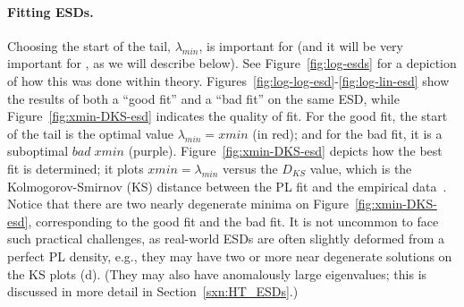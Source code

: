 
\paragraph{Fitting ESDs.}
Choosing the start of the tail, $\lambda_{min}$, is important for \HTSR (and it will be very important for \SETOL, as we will describe below).
See Figure~\ref{fig:log-esds} for a depiction of how this was done within \HTSR theory.
Figures~\ref{fig:log-log-esd}-\ref{fig:log-lin-esd} show the results of both a ``good fit'' and a ``bad fit'' on the same ESD,
while Figure~\ref{fig:xmin-DKS-esd} indicates the quality of fit.
For the good fit, the start of the tail is the optimal value $\lambda_{min}=xmin$ (in red); and for the bad fit, it is a suboptimal $bad\;xmin$ (purple).
Figure~\ref{fig:xmin-DKS-esd} depicts how the best fit is determined; it plots $xmin=\lambda_{min}$ versus the $D_{KS}$ 
value, which is the Kolmogorov-Smirnov (KS) distance between the PL fit and the empirical data~\cite{CSN09_powerlaw}.
Notice that there are two nearly degenerate minima on Figure~\ref{fig:xmin-DKS-esd}, corresponding to the good fit and the bad fit. 
It is not uncommon to face such practical challenges, as real-world ESDs are often slightly deformed from a perfect PL density, e.g.,
they may have two or more near degenerate solutions on the KS plots (d).
(They may also have anomalously large eigenvalues; this is discussed in more detail in Section~\ref{sxn:HT_ESDs}.)


